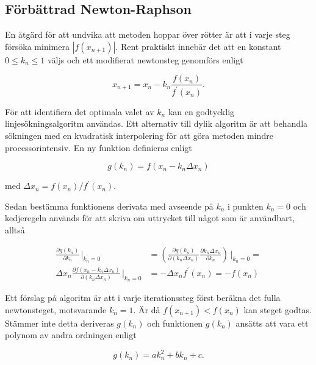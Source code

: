 \subsection{Förbättrad Newton-Raphson}

En åtgärd för att undvika att metoden hoppar över rötter är att i varje steg försöka minimera $|f(x_{n+1})|$.
Rent praktiskt innebär det att en konstant $0 \le k_n \le 1$ väljs och ett modifierat
newtonsteg genomförs enligt

\begin{equation}
\label{eq:newtonmodified}
x_{n+1} = x_n - k_n\frac{f(x_n)}{f^\prime(x_n)}.
\end{equation}

För att identifiera det optimala valet av $k_n$ kan en godtycklig linje\-söknings\-algoritm användas. Ett alternativ till dylik algoritm
är att behandla sökningen med en kvadratisk interpolering för att göra metoden mindre processor\-intensiv. En ny funktion definieras
enligt 

\begin{equation}
\label{eq:newtong}
g(k_n) = f(x_n- k_n\Delta x_n)
\end{equation}

med $\Delta x_n = f(x_n)/f^\prime(x_n)$.

Sedan bestämma funktionens derivata med avseende på $k_n$ i punkten $k_n=0$
och kedjeregeln används för att skriva om uttrycket till något som är användbart, alltså

\begin{align}
\frac{\partial g(k_n)}{\partial k_n}\,\bigg|_{k_n=0} & = 
\left(\frac{\partial g(k_n)}{\partial (k_n\Delta x_n)}
\frac{\partial k_n \Delta x_n}{\partial k_n}\right)\,\bigg|_{k_n=0} = \nonumber \\
\Delta x_n \frac{\partial f(x_n- k_n\Delta x_n)}{\partial (k_n\Delta x_n)}\,\bigg|_{k_n=0} & = 
-\Delta x_n f^\prime(x_n) = - f(x_n)
\label{eq:newtongmin}
\end{align}

Ett förslag på algoritm är att i varje iterations\-steg först beräkna det fulla newtonsteget, motsvarande $k_n=1$.
Är då $f(x_{n+1}) < f(x_n)$ kan steget godtas. Stämmer inte detta deriveras $g(k_n)$ och funktionen $g(k_n)$ ansätts att vara ett polynom av andra ordningen enligt

\begin{equation}
\label{eq:newtonfit}
g(k_n) = ak^2_n + bk_n + c.
\end{equation}

